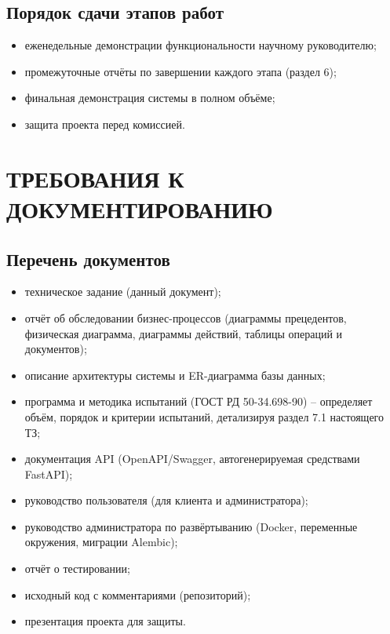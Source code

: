 \subsection{Порядок сдачи этапов работ}

\begin{itemize}
  \item еженедельные демонстрации функциональности научному руководителю;
  \item промежуточные отчёты по завершении каждого этапа (раздел 6);
  \item финальная демонстрация системы в полном объёме;
  \item защита проекта перед комиссией.
\end{itemize}

\section{ТРЕБОВАНИЯ К ДОКУМЕНТИРОВАНИЮ}

\subsection{Перечень документов}

\begin{itemize}
  \item техническое задание (данный документ);
  \item отчёт об обследовании бизнес-процессов (диаграммы прецедентов, физическая диаграмма, диаграммы действий, таблицы операций и документов);
  \item описание архитектуры системы и ER-диаграмма базы данных;
  \item программа и методика испытаний (ГОСТ РД 50-34.698-90) -- определяет объём, порядок и критерии испытаний, детализируя раздел 7.1 настоящего ТЗ;
  \item документация API (OpenAPI/Swagger, автогенерируемая средствами FastAPI);
  \item руководство пользователя (для клиента и администратора);
  \item руководство администратора по развёртыванию (Docker, переменные окружения, миграции Alembic);
  \item отчёт о тестировании;
  \item исходный код с комментариями (репозиторий);
  \item презентация проекта для защиты.
\end{itemize}

